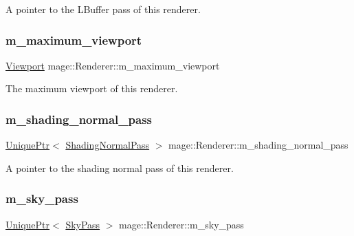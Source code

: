 A pointer to the L\+Buffer pass of this renderer. \hypertarget{classmage_1_1_renderer_a4a874bbe3cd4f19a16a65cca7bb93100}{}\label{classmage_1_1_renderer_a4a874bbe3cd4f19a16a65cca7bb93100} 
\subsubsection{\texorpdfstring{m\+\_\+maximum\+\_\+viewport}{m\_maximum\_viewport}}
{\footnotesize\ttfamily \hyperlink{classmage_1_1_viewport}{Viewport} mage\+::\+Renderer\+::m\+\_\+maximum\+\_\+viewport\hspace{0.3cm}{\ttfamily [private]}}

The maximum viewport of this renderer. \hypertarget{classmage_1_1_renderer_a1867f2dd151f3180b8efebba5b018fc8}{}\label{classmage_1_1_renderer_a1867f2dd151f3180b8efebba5b018fc8} 
\subsubsection{\texorpdfstring{m\+\_\+shading\+\_\+normal\+\_\+pass}{m\_shading\_normal\_pass}}
{\footnotesize\ttfamily \hyperlink{namespacemage_a3316d7143a973e37adf1110f2e80ca31}{Unique\+Ptr}$<$ \hyperlink{classmage_1_1_shading_normal_pass}{Shading\+Normal\+Pass} $>$ mage\+::\+Renderer\+::m\+\_\+shading\+\_\+normal\+\_\+pass\hspace{0.3cm}{\ttfamily [private]}}

A pointer to the shading normal pass of this renderer. \hypertarget{classmage_1_1_renderer_a7e9d76a3294d0a5b2d99a5335ff0cd04}{}\label{classmage_1_1_renderer_a7e9d76a3294d0a5b2d99a5335ff0cd04} 
\subsubsection{\texorpdfstring{m\+\_\+sky\+\_\+pass}{m\_sky\_pass}}
{\footnotesize\ttfamily \hyperlink{namespacemage_a3316d7143a973e37adf1110f2e80ca31}{Unique\+Ptr}$<$ \hyperlink{classmage_1_1_sky_pass}{Sky\+Pass} $>$ mage\+::\+Renderer\+::m\+\_\+sky\+\_\+pass\hspace{0.3cm}{\ttfamily [private]}}

